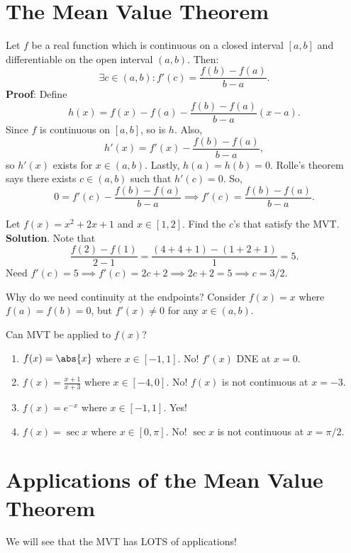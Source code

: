 \section{The Mean Value Theorem}
\begin{Theorem}{}{}
    Let $ f $ be a real function which is continuous on a closed interval
    $ [a,b] $ and differentiable on the open interval $ (a,b) $.\smallskip
    Then:
    \[ \exists c\in(a,b):f'(c)=\frac{f(b)-f(a)}{b-a}. \]
    \tcblower{}
    \textbf{Proof}: Define
    \[ h(x)=f(x)-f(a)-\frac{f(b)-f(a)}{b-a}(x-a). \]
    Since $ f $ is continuous on $ [a,b] $, so is $ h $. Also,
    \[ h'(x)=f'(x)-\frac{f(b)-f(a)}{b-a}, \]
    so $ h'(x) $ exists for $ x\in(a,b) $. Lastly,
    $ h(a)=h(b)=0 $. Rolle's theorem says there exists $ c\in(a,b) $
    such that $ h'(c)=0 $. So,
    \[ 0=f'(c)-\frac{f(b)-f(a)}{b-a}\implies f'(c)=\frac{f(b)-f(a)}{b-a}. \]
\end{Theorem}
\begin{Example}{}{}
    Let $ f(x)=x^2+2x+1 $ and $ x\in[1,2] $. Find the $ c $'s that satisfy the MVT\@.
    \tcblower{}
    \textbf{Solution}. Note that
    \[ \frac{f(2)-f(1)}{2-1}=\frac{(4+4+1)-(1+2+1)}{1}=5. \]
    Need $ f'(c)=5\implies f'(c)=2c+2\implies 2c+2=5\implies c=3/2 $.
\end{Example}
\begin{Remark}{}{}
    Why do we need continuity at the endpoints?
    Consider $ f(x)=x $ where $ f(a)=f(b)=0 $, but $ f'(x)\ne 0 $ for any $ x\in(a,b) $.
\end{Remark}
\begin{Example}{}{}
    Can MVT be applied to $ f(x) $?
    \begin{enumerate}[(1)]
        \item $ f(x)=\abs{x} $ where $ x\in[-1,1] $. No! $ f'(x) $ DNE at $ x=0 $.
        \item $ f(x)=\frac{x+1}{x+3} $ where $ x\in[-4,0] $. No! $ f(x) $ is not continuous at $ x=-3 $.
        \item $ f(x)=e^{-x} $ where $ x\in[-1,1] $. Yes!
        \item $ f(x)=\sec x $ where $ x\in[0,\pi] $. No! $ \sec x $ is not continuous at $ x=\pi/2 $.
    \end{enumerate}
\end{Example}
\section{Applications of the Mean Value Theorem}
We will see that the MVT has LOTS of applications!

